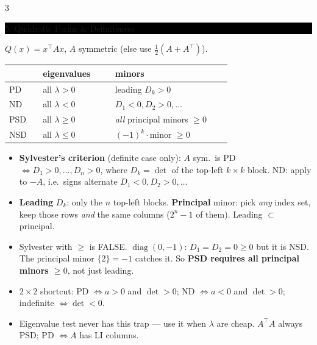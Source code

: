 \documentclass[8pt,letterpaper]{article}
\makeatletter
\newcommand{\sect}[1]{%
  \vspace{2.2pt}%
  \noindent\colorbox{black}{\parbox{\dimexpr\linewidth-2\fboxsep}{%
    \color{white}\bfseries\scshape\fontsize{6.4}{7.4}\selectfont
    \hyphenpenalty=10000\exhyphenpenalty=10000\raggedright #1}}%
  \vspace{1.4pt}\par\nopagebreak\@afterheading}
\newenvironment{tl}
  {\begin{itemize}[leftmargin=6pt,itemsep=0.3pt,topsep=1pt,parsep=0pt,
                   partopsep=0pt,label=\textcolor{gray}{\tiny$\bullet$}]}
  {\end{itemize}}
\newcommand{\tp}{^{\!\top}}
\makeatother
\begin{document}
\begin{multicols}{3}
\sect{5. Quadratic Forms \& Definiteness}
$Q(x)=x\tp Ax$, $A$ symmetric (else use $\tfrac12(A+A\tp)$).
\begin{center}\fontsize{5.9}{6.8}\selectfont
\begin{tabular}{@{}p{0.13\linewidth}p{0.28\linewidth}p{0.45\linewidth}@{}}
\hline
 & eigenvalues & minors\\ \hline
PD & all $\lambda>0$ & leading $D_k>0$\\
ND & all $\lambda<0$ & $D_1<0,D_2>0,\dots$\\
PSD & all $\lambda\ge0$ & \emph{all} principal minors $\ge0$\\
NSD & all $\lambda\le0$ & $(-1)^k\cdot$minor $\ge0$\\ \hline
\end{tabular}
\end{center}
\begin{tl}
\item \textbf{Sylvester's criterion} (definite case only): $A$ sym.\ is PD $\iff D_1>0,\dots,D_n>0$, where $D_k=\det$ of the top-left $k\times k$ block. ND: apply to $-A$, i.e.\ signs alternate $D_1<0,D_2>0,\dots$
\item \textbf{Leading} $D_k$: only the $n$ top-left blocks. \textbf{Principal} minor: pick \emph{any} index set, keep those rows \emph{and} the same columns ($2^n-1$ of them). Leading $\subset$ principal.
\item \colorbox{black!12}{Sylvester with $\ge$ is FALSE.} $\operatorname{diag}(0,-1)$: $D_1=D_2=0\ge0$ but it is NSD. The principal minor $\{2\}=-1$ catches it. So \textbf{PSD requires all principal minors $\ge0$}, not just leading.
\item $2\times2$ shortcut: PD $\iff a>0$ and $\det>0$; ND $\iff a<0$ and $\det>0$; indefinite $\iff\det<0$.
\item Eigenvalue test never has this trap --- use it when $\lambda$ are cheap. $A\tp A$ always PSD; PD $\iff A$ has LI columns.
\end{tl}


\end{multicols}
\end{document}
